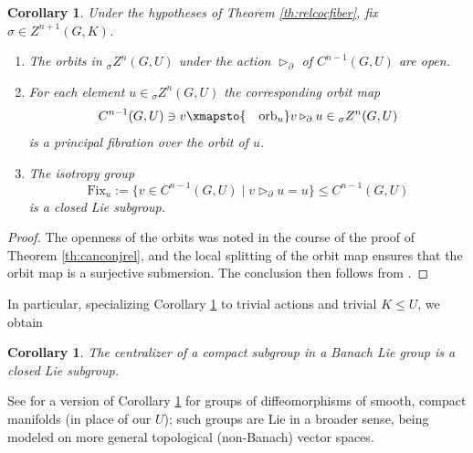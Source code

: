 \documentclass[10pt,a4paper]{amsart}
\numberwithin{equation}{section}
\newtheorem{Corollary}[Theorem]{Corollary}
\begin{document}
\begin{Corollary}\label{cor:orbisfibrel}
 Under the hypotheses of Theorem {\rm \ref{th:relcocfiber}}, fix $\sigma\in Z^{n+1}(G,K)$.
 \begin{enumerate}[$(1)$]\itemsep=0pt
 \item The orbits in ${}_{\sigma}Z^n(G,U)$ under the action $\triangleright_{\partial}$ of $C^{n-1}(G,U)$ are open.

 \item For each element $u\in {}_{\sigma}Z^n(G,U)$ the corresponding orbit map
 \begin{equation*}
 C^{n-1}(G,U)\ni v\xmapsto{\quad\mathrm{orb}_u}v\triangleright_{\partial}u\in {}_{\sigma}Z^n(G,U)
 \end{equation*}
 is a principal fibration over the orbit of $u$.

 \item\label{item:orbisfib} The isotropy group
 \begin{equation*}
 \mathrm{Fix}_u:=\big\{v\in C^{n-1}(G,U)\mid v\triangleright_{\partial}u = u\big\}\le C^{n-1}(G,U)
 \end{equation*}
 is a closed Lie subgroup.
 \end{enumerate}
\end{Corollary}
\begin{proof}


 The openness of the orbits was noted in the course of the proof of Theorem \ref{th:canconjrel}, and the local splitting of the orbit map ensures that the orbit map is a surjective submersion. The conclusion then follows from \cite[Section~III.1.6, Proposition 12]{bourb-lie-13}.
\end{proof}

In particular, specializing Corollary \ref{cor:orbisfibrel} to trivial actions and trivial $K\le U$, we obtain

\begin{Corollary}\label{cor:centcpct}
 The centralizer of a compact subgroup in a Banach Lie group is a closed Lie subgroup. \qedhere
\end{Corollary}

\begin{Remark}
 See \cite[Section~VI.3\,(A)]{om-inflie-bk} for a version of Corollary \ref{cor:centcpct} for groups of diffeomorphisms of smooth, compact manifolds (in place of our $U$); such groups are Lie in a broader sense, being modeled on more general topological (non-Banach) vector spaces.
\end{Remark}
\end{document}
